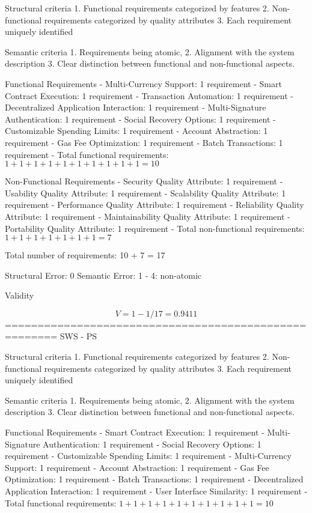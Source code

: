 Structural criteria 
1. Functional requirements categorized by features
2. Non-functional requirements categorized by quality attributes
3. Each requirement uniquely identified

Semantic criteria
1. Requirements being atomic, 
2. Alignment with the system description
3. Clear distinction between functional and non-functional aspects. 

Functional Requirements
- Multi-Currency Support: 1 requirement
- Smart Contract Execution: 1 requirement
- Transaction Automation: 1 requirement
- Decentralized Application Interaction: 1 requirement
- Multi-Signature Authentication: 1 requirement
- Social Recovery Options: 1 requirement
- Customizable Spending Limits: 1 requirement
- Account Abstraction: 1 requirement
- Gas Fee Optimization: 1 requirement
- Batch Transactions: 1 requirement
- Total functional requirements: \( 1 + 1 + 1 + 1 + 1 + 1 + 1 + 1 + 1 + 1 = 10 \)

Non-Functional Requirements
- Security Quality Attribute: 1 requirement
- Usability Quality Attribute: 1 requirement
- Scalability Quality Attribute: 1 requirement
- Performance Quality Attribute: 1 requirement
- Reliability Quality Attribute: 1 requirement
- Maintainability Quality Attribute: 1 requirement
- Portability Quality Attribute: 1 requirement
- Total non-functional requirements: \( 1 + 1 + 1 + 1 + 1 + 1 + 1 = 7 \)

Total number of requirements: 10 + 7 = 17

Structural Error: 0
Semantic Error: 1
- 4: non-atomic

Validity

\[
V = 1 - 1/17 = 0.9411
\]
======================================================
SWS - PS

Structural criteria 
1. Functional requirements categorized by features
2. Non-functional requirements categorized by quality attributes
3. Each requirement uniquely identified

Semantic criteria
1. Requirements being atomic, 
2. Alignment with the system description
3. Clear distinction between functional and non-functional aspects. 

Functional Requirements
- Smart Contract Execution: 1 requirement
- Multi-Signature Authentication: 1 requirement
- Social Recovery Options: 1 requirement
- Customizable Spending Limits: 1 requirement
- Multi-Currency Support: 1 requirement
- Account Abstraction: 1 requirement
- Gas Fee Optimization: 1 requirement
- Batch Transactions: 1 requirement
- Decentralized Application Interaction: 1 requirement
- User Interface Similarity: 1 requirement
- Total functional requirements: \( 1 + 1 + 1 + 1 + 1 + 1 + 1 + 1 + 1 + 1 = 10 \)

